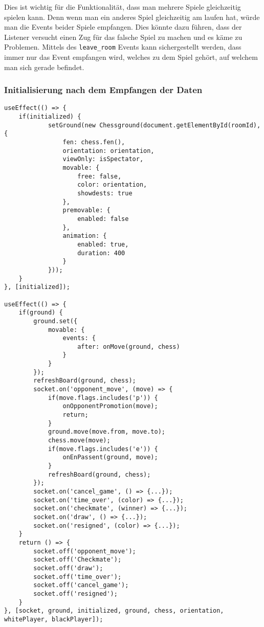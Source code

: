Dies ist wichtig für die Funktionalität, dass man mehrere Spiele gleichzeitig spielen kann. Denn wenn man ein anderes Spiel gleichzeitig am laufen hat, würde man die Events beider Spiele empfangen. Dies könnte dazu führen, dass der Listener versucht einen Zug für das falsche Spiel zu machen und es käme zu Problemen. Mittels des \verb|leave_room| Events kann sichergestellt werden, dass immer nur das Event empfangen wird, welches zu dem Spiel gehört, auf welchem man sich gerade befindet.

\subsubsection{Initialisierung nach dem Empfangen der Daten}


\begin{lstlisting}[style=codeStyle, caption={Initialisierung des Schachspiels nach Empfangen der Daten}, label={lst:chessground}]
useEffect(() => {
    if(initialized) {
            setGround(new Chessground(document.getElementById(roomId), {
                fen: chess.fen(),
                orientation: orientation,
                viewOnly: isSpectator,
                movable: {
                    free: false,
                    color: orientation,
                    showdests: true
                },
                premovable: {
                    enabled: false
                },
                animation: {
                    enabled: true,
                    duration: 400
                }
            }));
    }
}, [initialized]);
    
useEffect(() => {
    if(ground) {
        ground.set({
            movable: {
                events: {
                    after: onMove(ground, chess)
                }
            }
        });
        refreshBoard(ground, chess);        
        socket.on('opponent_move', (move) => {
            if(move.flags.includes('p')) {
                onOpponentPromotion(move);
                return;
            }
            ground.move(move.from, move.to);
            chess.move(move);
            if(move.flags.includes('e')) {
                onEnPassent(ground, move);
            }
            refreshBoard(ground, chess);
        });
        socket.on('cancel_game', () => {...});
        socket.on('time_over', (color) => {...});
        socket.on('checkmate', (winner) => {...});
        socket.on('draw', () => {...});
        socket.on('resigned', (color) => {...});
    }
    return () => {
        socket.off('opponent_move');
        socket.off('Checkmate');
        socket.off('draw');
        socket.off('time_over');
        socket.off('cancel_game');
        socket.off('resigned');
    }
}, [socket, ground, initialized, ground, chess, orientation, whitePlayer, blackPlayer]);
\end{lstlisting}

